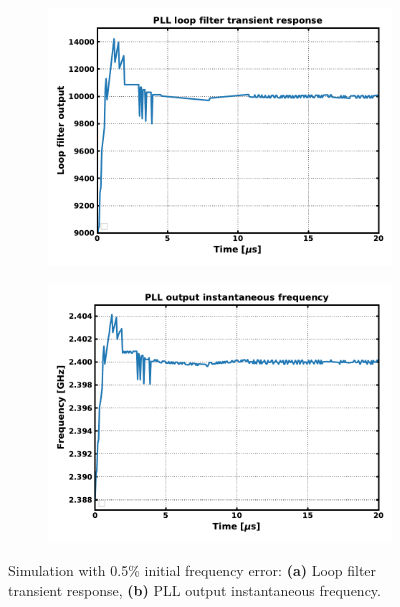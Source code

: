 			\begin{figure}[htb!]
			    \centering
			    \begin{subfigure}{0.5\textwidth}
			        \centering
			        \center\includegraphics[width=1.0\textwidth, angle=0]{figs/trans_loop_filter_fast.pdf}
			        \caption{ }
			        \label{fig:trans_lf_fast}
			    \end{subfigure}%
			    \begin{subfigure}{0.5\textwidth}
			        \centering
			        \center\includegraphics[width=1.0\textwidth, angle=0]{figs/trans_inst_freq_fast.pdf}
			        \caption{ }
			        \label{fig:trans_inst_freq_fast}
			    \end{subfigure}
			    \label{fig:trans_sim1_fast}
			    \caption{Simulation with 0.5\% initial frequency error: \textbf{(a)} Loop filter transient response, \textbf{(b)} PLL output instantaneous frequency.}
			\end{figure}

